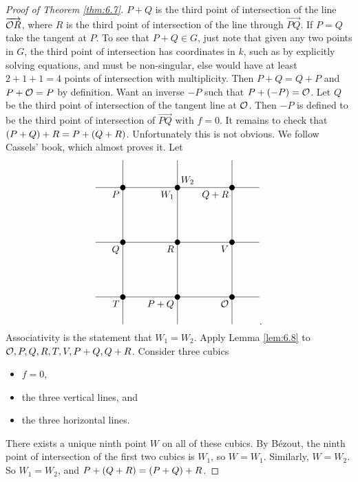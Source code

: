 \begin{proof}[Proof of Theorem \ref{thm:6.7}]
$ P + Q $ is the third point of intersection of the line $ \overrightarrow{\mathcal{O} R} $, where $ R $ is the third point of intersection of the line through $ \overrightarrow{PQ} $. If $ P = Q $ take the tangent at $ P $. To see that $ P + Q \in G $, just note that given any two points in $ G $, the third point of intersection has coordinates in $ k $, such as by explicitly solving equations, and must be non-singular, else would have at least $ 2 + 1 + 1 = 4 $ points of intersection with multiplicity. Then $ P + Q = Q + P $ and $ P + \mathcal{O} = P $ by definition. Want an inverse $ -P $ such that $ P + \br{-P} = \OOO $. Let $ Q $ be the third point of intersection of the tangent line at $ \mathcal{O} $. Then $ -P $ is defined to be the third point of intersection of $ \overrightarrow{PQ} $ with $ f = 0 $. It remains to check that $ \br{P + Q} + R = P + \br{Q + R} $. Unfortunately this is not obvious. We follow Cassels' book, which almost proves it. Let
$$
\begin{tikzpicture}[scale=2]
\fill (0, 0) circle (0.05) node[below left]{$ \OOO $};
\fill (-1, 0) circle (0.05) node[below left]{$ P + Q $};
\fill (-2, 0) circle (0.05) node[below left]{$ T $};
\fill (0, 1) circle (0.05) node[below left]{$ V $};
\fill (-1, 1) circle (0.05) node[below left]{$ R $};
\fill (-2, 1) circle (0.05) node[below left]{$ Q $};
\fill (0, 2) circle (0.05) node[below left]{$ Q + R $};
\fill (-1, 2) circle (0.05) node[below left]{$ W_1 $} node[above right]{$ W_2 $};
\fill (-2, 2) circle (0.05) node[below left]{$ P $};
\draw (0.5, 0) to (-2.5, 0);
\draw (0.5, 1) to (-2.5, 1);
\draw (0.5, 2) to (-2.5, 2);
\draw (0, -0.5) to (0, 2.5);
\draw (-1, -0.5) to (-1, 2.5);
\draw (-2, -0.5) to (-2, 2.5);
\end{tikzpicture}.
$$
Associativity is the statement that $ W_1 = W_2 $. Apply Lemma \ref{lem:6.8} to $ \mathcal{O}, P, Q, R, T, V, P + Q, Q + R $. Consider three cubics
\begin{itemize}
\item $ f = 0 $,
\item the three vertical lines, and
\item the three horizontal lines.
\end{itemize}
There exists a unique ninth point $ W $ on all of these cubics. By B\'ezout, the ninth point of intersection of the first two cubics is $ W_1 $, so $ W = W_1 $. Similarly, $ W = W_2 $. So $ W_1 = W_2 $, and $ P + \br{Q + R} = \br{P + Q} + R $.
\end{proof}


